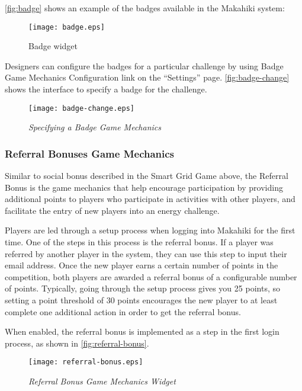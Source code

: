 \autoref{fig:badge} shows an example of the badges available in the Makahiki system:

\begin{figure}[t!]
  \center
  \texttt{[image: badge.eps]}
  \caption{Badge widget}
  \label{fig:badge}
\end{figure}

Designers can configure the badges for a particular challenge by using Badge Game Mechanics Configuration link on the ``Settings'' page. \autoref{fig:badge-change} shows the interface to specify a badge for the challenge.

\begin{figure}[!ht]
  \center
  \texttt{[image: badge-change.eps]}
  \caption{\em Specifying a Badge Game Mechanics}
  \label{fig:badge-change}
\end{figure}

\clearpage

\subsubsection{Referral Bonuses Game Mechanics}

Similar to social bonus described in the Smart Grid Game above, the Referral Bonus is the game mechanics that help encourage participation by providing additional points to players who participate in activities with other players, and facilitate the entry of new players into an energy challenge.

Players are led through a setup process when logging into Makahiki for the first time. One of the steps in this process is the referral bonus. If a player was referred by another player in the system, they can use this step to input their email address. Once the new player earns a certain number of points in the competition, both players are awarded a referral bonus of a configurable number of points. Typically, going through the setup process gives you 25 points, so setting a point threshold of 30 points encourages the new player to at least complete one additional action in order to get the referral bonus.

When enabled, the referral bonus is implemented as a step in the first login process, as shown in \autoref{fig:referral-bonus}.

\begin{figure}[!ht]
  \center
  \texttt{[image: referral-bonus.eps]}
  \caption{\em Referral Bonus Game Mechanics Widget}
  \label{fig:referral-bonus}
\end{figure}


